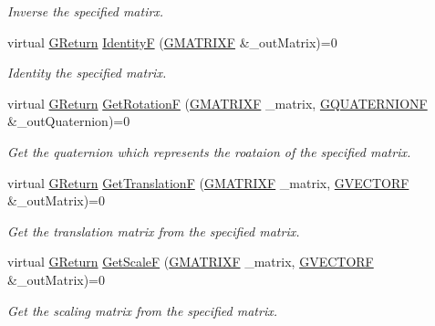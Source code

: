 \begin{DoxyCompactItemize}
\begin{DoxyCompactList}\small\item\em Inverse the specified matirx. \end{DoxyCompactList}\item 
virtual \hyperlink{namespaceGW_a67a839e3df7ea8a5c5686613a7a3de21}{G\+Return} \hyperlink{classGW_1_1MATH_1_1GMatrix_aee68de35de388c5893b6fcdd450dd1d3}{IdentityF} (\hyperlink{structGW_1_1MATH_1_1GMATRIXF}{G\+M\+A\+T\+R\+I\+XF} \&\+\_\+out\+Matrix)=0
\begin{DoxyCompactList}\small\item\em Identity the specified matrix. \end{DoxyCompactList}\item 
virtual \hyperlink{namespaceGW_a67a839e3df7ea8a5c5686613a7a3de21}{G\+Return} \hyperlink{classGW_1_1MATH_1_1GMatrix_a1c9745c2b04e1ab4d4446d65c5f0fb89}{Get\+RotationF} (\hyperlink{structGW_1_1MATH_1_1GMATRIXF}{G\+M\+A\+T\+R\+I\+XF} \+\_\+matrix, \hyperlink{structGW_1_1MATH_1_1GQUATERNIONF}{G\+Q\+U\+A\+T\+E\+R\+N\+I\+O\+NF} \&\+\_\+out\+Quaternion)=0
\begin{DoxyCompactList}\small\item\em Get the quaternion which represents the roataion of the specified matrix. \end{DoxyCompactList}\item 
virtual \hyperlink{namespaceGW_a67a839e3df7ea8a5c5686613a7a3de21}{G\+Return} \hyperlink{classGW_1_1MATH_1_1GMatrix_a5948489188390e3566f7a0fcba687c97}{Get\+TranslationF} (\hyperlink{structGW_1_1MATH_1_1GMATRIXF}{G\+M\+A\+T\+R\+I\+XF} \+\_\+matrix, \hyperlink{structGW_1_1MATH_1_1GVECTORF}{G\+V\+E\+C\+T\+O\+RF} \&\+\_\+out\+Matrix)=0
\begin{DoxyCompactList}\small\item\em Get the translation matrix from the specified matrix. \end{DoxyCompactList}\item 
virtual \hyperlink{namespaceGW_a67a839e3df7ea8a5c5686613a7a3de21}{G\+Return} \hyperlink{classGW_1_1MATH_1_1GMatrix_aaf1e6774edbb0d9e2b5074298bcae8dd}{Get\+ScaleF} (\hyperlink{structGW_1_1MATH_1_1GMATRIXF}{G\+M\+A\+T\+R\+I\+XF} \+\_\+matrix, \hyperlink{structGW_1_1MATH_1_1GVECTORF}{G\+V\+E\+C\+T\+O\+RF} \&\+\_\+out\+Matrix)=0
\begin{DoxyCompactList}\small\item\em Get the scaling matrix from the specified matrix. \end{DoxyCompactList}\item 

\end{DoxyCompactItemize}
